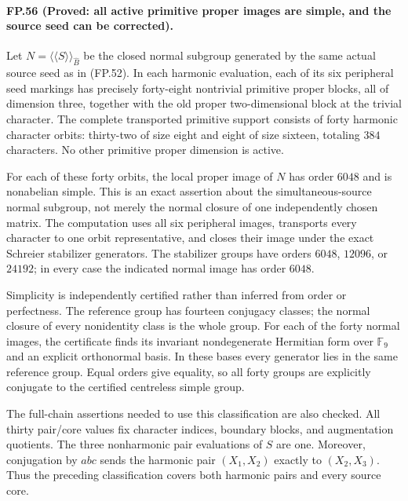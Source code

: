 \paragraph{FP.56 (Proved: all active primitive proper images are simple, and the source seed can be corrected).}
Let $N=\langle\!\langle S\rangle\!\rangle_{\widehat B}$ be the
closed normal subgroup generated by the same actual source seed as
in (FP.52). In each harmonic evaluation, each of its six peripheral
seed markings has precisely forty-eight nontrivial primitive proper
blocks, all of dimension three, together with the old proper
two-dimensional block at the trivial character. The complete
transported primitive support consists of forty harmonic character
orbits: thirty-two of size eight and eight of size sixteen, totaling
$384$ characters. No other primitive proper dimension is active.

For each of these forty orbits, the local proper image of $N$ has
order $6048$ and is nonabelian simple. This is an exact assertion
about the simultaneous-source normal subgroup, not merely the
normal closure of one independently chosen matrix. The computation
uses all six peripheral images, transports every character to one
orbit representative, and closes their image under the exact
Schreier stabilizer generators. The stabilizer groups have orders
$6048$, $12096$, or $24192$; in every case the indicated normal
image has order $6048$.

Simplicity is independently certified rather than inferred from
order or perfectness. The reference group has fourteen conjugacy
classes; the normal closure of every nonidentity class is the
whole group. For each of the forty normal images, the certificate
finds its invariant nondegenerate Hermitian form over $\mathbb F_9$
and an explicit orthonormal basis. In these bases every generator
lies in the same reference group. Equal orders give equality,
so all forty groups are explicitly conjugate to the certified
centreless simple group.

The full-chain assertions needed to use this classification are
also checked. All thirty pair/core values fix character indices,
boundary blocks, and augmentation quotients. The three nonharmonic
pair evaluations of $S$ are one. Moreover, conjugation by $abc$
sends the harmonic pair $(X_1,X_2)$ exactly to $(X_2,X_3)$.
Thus the preceding classification covers both harmonic pairs and
every source core.

